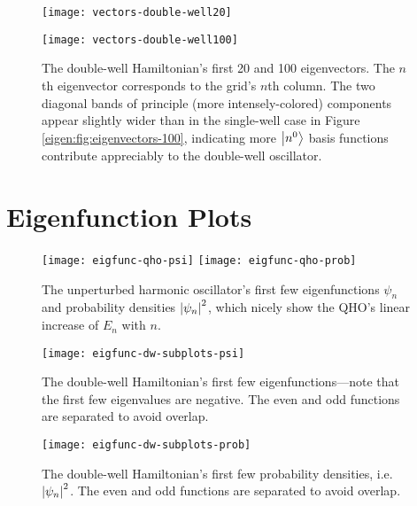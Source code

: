 \documentclass[11pt, a4paper]{article}
\begin{document}
\begin{figure}[htb!]
	\centering
	{\texttt{[image: vectors-double-well20]}}\vfill 
	
	{\texttt{[image: vectors-double-well100]}}\vfill
	
	\caption{The double-well Hamiltonian's first 20 and 100 eigenvectors. The $ n $th eigenvector corresponds to the grid's $ n $th column. The two diagonal bands of principle (more intensely-colored) components appear slightly wider than in the single-well case in Figure \ref{eigen:fig:eigenvectors-100}, indicating more $ \ket{n^{0}} $ basis functions contribute appreciably to the double-well oscillator.}
	\label{eigen:fig:eigenvectors-double-well}
\end{figure}

\section{Eigenfunction Plots} \label{eigen:s:more-graphs-B}


\begin{figure}[htb!]
	\centering
	{\texttt{[image: eigfunc-qho-psi]}}\hfill  %
	{\texttt{[image: eigfunc-qho-prob]}}\hfill
	\caption{The unperturbed harmonic oscillator's first few eigenfunctions $ \psi_{n} $ and probability densities $ \abs{\psi_{n}}^{2} $, which nicely show the QHO's linear increase of $ E_{n} $ with $ n $.}
	\label{eigen:fig:eigenfunc-qho}
\end{figure}




\begin{figure}[htb!]
	\centering
	\texttt{[image: eigfunc-dw-subplots-psi]}
	\caption{The double-well Hamiltonian's first few eigenfunctions---note that the first few eigenvalues are negative. The even and odd functions are separated to avoid overlap.}
	\label{eigen:fig:eigfunc-dw-psi}
\end{figure}

\begin{figure}[htb!]
	\centering
	\texttt{[image: eigfunc-dw-subplots-prob]}
	\caption{The double-well Hamiltonian's first few probability densities, i.e. $ \abs{\psi_{n}}^{2} $. The even and odd functions are separated to avoid overlap.}
	\label{eigen:fig:eigfunc-dw-prob}
\end{figure}

\iffalse
\end{document}
